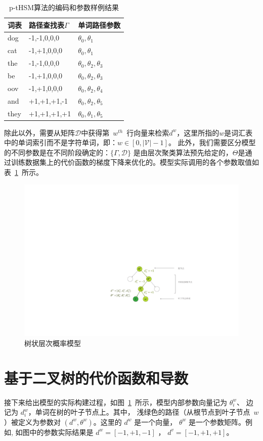 \begin{table}[!ht]
  \centering
  \caption{p-tHSM算法的编码和参数样例结果}\label{tab:example}
\begin{tabular}{lll}
  \toprule
  词表&路径查找表$\Gamma$& 单词路径参数\\ \midrule
dog & -1,-1,0,0,0& $\theta_0,\theta_1$\\
cat & -1,+1,0,0,0&$\theta_0,\theta_1$\\
the & -1,-1,0,0,0& $\theta_0,\theta_2,\theta_3$\\
be & -1,+1,0,0,0&$\theta_0,\theta_2,\theta_3$\\
oov & -1,+1,0,0,0&$\theta_0,\theta_2,\theta_4$\\
and & +1,+1,+1,-1& $\theta_0,\theta_2,\theta_5$\\
they & +1,+1,+1,+1&$\theta_0,\theta_1,\theta_5$\\
  \bottomrule
\end{tabular}
\end{table}


除此以外，需要从矩阵$\mathcal{D}$中获得第~$w^{th}$~行向量来检索$d^w$，这里所指的$w$是词汇表中的单词索引而不是字符单词，即：$w\in [0,\mathcal{|V|}-1]$。 此外，我们需要区分模型的不同参数是在不同阶段确定的：$\{\Gamma,\mathcal{D}\}$ 是由层次聚类算法预先给定的，$\Theta$是通过训练数据集上的代价函数的梯度下降来优化的。模型实际调用的各个参数取值如表~\ref{tab:example}~所示。


\begin{figure}[!h]
  \centering
    \includegraphics[width=0.93\linewidth]{./figures/thsm.pdf}
\caption{树状层次概率模型}\label{fig:tree_hsm} %
\end{figure}

\section{基于二叉树的代价函数和导数}
接下来给出模型的实际构建过程，如图~\ref{fig:tree_hsm}~所示，模型内部参数向量记为 $\theta_i^w$、 边记为 $d_i^w$，单词在树的叶子节点上。其中， 浅绿色的路径（从根节点到叶子节点~$w$）被定义为参数对 $(d^w,\theta^w)$。这里的 $d^w$ 是一个向量， $\theta^w$ 是一个参数矩阵。例如, 如图中的参数实际结果是 $d^w=[-1,+1,-1]$ ， $d^{v}=[-1,+1,+1]$。

